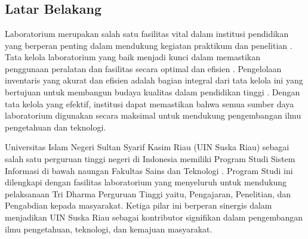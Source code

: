 %
%
%
%

\chapter{\babSatu}

\section{Latar Belakang}
\thispagestyle{fancy} %
Laboratorium merupakan salah satu fasilitas vital dalam institusi pendidikan yang berperan penting dalam mendukung kegiatan praktikum dan penelitian \cite{la2021comparison}. Tata kelola laboratorium yang baik menjadi kunci dalam memastikan penggunaan peralatan dan fasilitas secara optimal dan efisien \cite{abrantes2020governance}. Pengelolaan inventaris yang akurat dan efisien adalah bagian integral dari tata kelola ini yang bertujuan untuk membangun budaya kualitas dalam pendidikan tinggi \cite{abrantes2020governance}. Dengan tata kelola yang efektif, institusi dapat memastikan bahwa semua sumber daya laboratorium digunakan secara maksimal untuk mendukung pengembangan ilmu pengetahuan dan teknologi.

Universitas Islam Negeri Sultan Syarif Kasim Riau (UIN Suska Riau) sebagai salah satu perguruan tinggi negeri di Indonesia memiliki Program Studi Sistem Informasi di bawah naungan Fakultas Sains dan Teknologi \cite{uin-suska-website}. Program Studi ini dilengkapi dengan fasilitas laboratorium yang menyeluruh untuk mendukung pelaksanaan Tri Dharma Perguruan Tinggi yaitu, Pengajaran, Penelitian, dan Pengabdian kepada masyarakat. Ketiga pilar ini berperan sinergis dalam menjadikan UIN Suska Riau sebagai kontributor signifikan dalam pengembangan ilmu pengetahuan, teknologi, dan kemajuan masyarakat.

